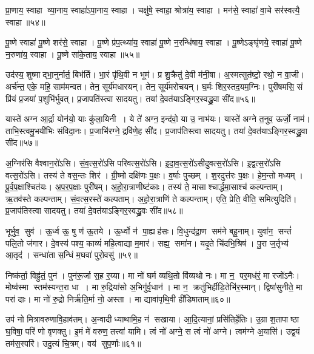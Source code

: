 प्रा॒णाय॒ स्वाहा व्या॒नाय॒ स्वाहा॑ऽपा॒नाय॒ स्वाहा। 
चक्षु॑षे॒ स्वाहा॒ श्रोत्रा॑य॒ स्वाहा। 
मन॑से॒ स्वाहा॑ वा॒चे सर॑स्वत्यै॒ स्वाहा॥५४॥%
\anuvakamend

पू॒ष्णे स्वाहा॑ पू॒ष्णे शर॑से॒ स्वाहा। 
पू॒ष्णे प्र॑प॒त्थ्या॑य॒ स्वाहा॑ पू॒ष्णे न॒रन्धि॑षाय॒ स्वाहा। 
पू॒ष्णेऽङ्घृ॑णये॒ स्वाहा॑ पू॒ष्णे न॒रुणा॑य॒ स्वाहा। 
पू॒ष्णे सा॑के॒ताय॒ स्वाहा॥५५॥
\anuvakamend


उद॑स्य॒ शुष्माद्भा॒नुर्नार्त॒ बिभ॑र्ति। 
भा॒रं पृ॑थि॒वी न भूम॑। 
प्र शु॒क्रैतु॑ दे॒वी म॑नी॒षा। 
अ॒स्मत्सुत॑ष्टो॒ रथो॒ न वा॒जी। 
अर्च॑न्त॒ एके॒ महि॒ साम॑मन्वत। 
तेन॒ सूर्य॑मधारयन्। 
तेन॒ सूर्य॑मरोचयन्। 
घ॒र्मः  शिर॒स्तद॒यम॒ग्निः। 
पुरी॑षमसि॒ सं प्रि॑यं प्र॒जया॑ प॒शुभि॑र्भुवत्। 
प्र॒जापति॑स्त्वा सादयतु। 
तया॑ दे॒वत॑याऽङ्गिर॒स्वद्ध्रु॒वा सी॑द॥५६॥
\anuvakamend

यास्ते॑ अग्न आ॒र्द्रा योन॑यो॒ याः कु॑ला॒यिनी। 
ये ते॑ अग्न॒ इन्द॑वो॒ या उ॒ नाभ॑यः। 
यास्ते॑ अग्ने त॒नुव॒ ऊर्जो॒ नाम॑। 
ताभि॒स्त्वमु॒भयी॑भिः संविदा॒नः। 
प्र॒जाभि॑रग्ने॒ द्रवि॑णे॒ह सी॑द। 
प्र॒जाप॑तिस्त्वा सादयतु। 
तया॑ दे॒वत॑याऽङ्गिर॒स्वद्ध्रु॒वा सी॑द॥५७॥
\anuvakamend

अ॒ग्निर॑सि वैश्वान॒रो॑ऽसि। 
सं॒व॒त्स॒रो॑ऽसि परिवत्स॒रो॑ऽसि। 
इ॒दा॒व॒त्स॒रो॑ऽसीदुवत्स॒रो॑ऽसि। 
इ॒द्व॒त्स॒रो॑ऽसि वत्स॒रो॑ऽसि। 
तस्य॑ ते वस॒न्तः  शिर॑। 
ग्री॒ष्मो दक्षि॑णः प॒क्षः। 
व॒र्\mbox{}षाः पुच्छम्। 
श॒रदुत्त॑रः प॒क्षः। 
हे॒म॒न्तो मध्यम्। 
पू॒र्व॒प॒क्षाश्चित॑यः। 
अ॒प॒र॒प॒क्षाः पुरी॑षम्। 
अ॒हो॒रा॒त्राणीष्ट॑काः। 
तस्य॑ ते॒ मासाश्चार्द्धमा॒साश्च॑ कल्पन्ताम्। 
ऋ॒तव॑स्ते कल्पन्ताम्। 
सं॒व॒त्स॒रस्ते॑ कल्पताम्। 
अ॒हो॒रा॒त्राणि॑ ते कल्पन्ताम्। 
एति॒ प्रेति॒ वीति॒ समित्युदिति॑। 
प्र॒जाप॑तिस्त्वा सादयतु। 
तया॑ दे॒वत॑याऽङ्गिर॒स्वद्ध्रु॒वः सी॑द॥५८॥
\anuvakamend[चित॑यो॒ नव॑ च]


भूर्भुव॒ सुव॑। 
ऊ॒र्ध्व ऊ॒ षु ण॑ ऊ॒तये। 
ऊ॒र्ध्वो न॑ पा॒ह्यह॑सः। 
वि॒धुन्द॑द्रा॒ण सम॑ने बहू॒नाम्। 
युवा॑न॒ सन्तं॑ पलि॒तो ज॑गार। 
दे॒वस्य॑ पश्य॒ काव्यं॑ महि॒त्वाद्या म॒मार॑। 
सह्य॒ समा॑न। 
यदृ॒ते चि॑दभि॒श्रिष॑। 
पु॒रा ज॒र्तृभ्य॑ आ॒तृद॑। 
सन्धा॑ता स॒न्धिं म॒घवा॑ पुरो॒वसु॑॥५९॥

निष्क॑र्ता॒ विह्रु॑तं॒ पुन॑। 
पुन॑रू॒र्जा स॒ह र॒य्या। 
मा नो॑ घर्म व्यथि॒तो वि॑व्यथो नः। 
मा न॒ पर॒मध॑रं॒ मा रजो॑ऽनैः। 
मोष्व॑स्मा स्तम॑स्यन्त॒रा धा। 
मा रु॒द्रिया॑सो अ॒भिगु॑र्वृ॒धान॑। 
मा न॒ क्रतु॑भिर्\mbox{}हीडि॒तेभि॑र॒स्मान्। 
द्विषा॑सुनीते॒ मा परा॑ दाः। 
मा नो॑ रु॒द्रो निर्\mbox{}ऋ॑ति॒र्मा नो॒ अस्ता। 
मा द्यावा॑पृथि॒वी ही॑डिषाताम्॥६०॥

उप॑ नो मित्रावरुणावि॒हाव॑तम्। 
अ॒न्वादीध्याथामि॒ह न॑ सखाया। 
आ॒दि॒त्यानां॒ प्रसि॑तिर्\mbox{}हे॒तिः। 
उ॒ग्रा श॒तापाष्ठा घ॒विषा॒ परि॑ णो वृणक्तु। 
इ॒मं मे॑ वरुण॒ तत्त्वा॑ यामि। 
त्वं नो॑ अग्ने॒ स त्वं नो॑ अग्ने। 
त्वम॑ग्ने अ॒यासि॑। 
उद्व॒यं तम॑स॒स्परि॑। 
उदु॒त्यं चि॒त्रम्। 
वय॑ सुप॒र्णाः॥६१॥
\anuvakamend[पु॒रो॒वसु॑र्\mbox{}हीडिषाता सुप॒र्णाः]


